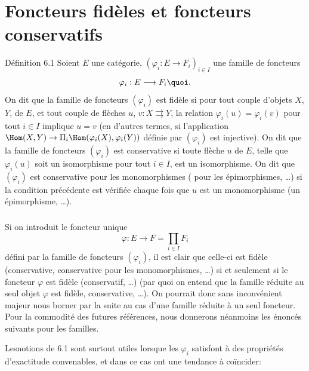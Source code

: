 \section{Foncteurs fidèles et foncteurs
  conservatifs}\pageoriginale

\begin{enonce*}{Définition 6.1}
Soient $E$ une catégorie, $(\varphi_i:E\rightarrow F_i)_{i\in I}$
une famille de foncteurs
$$
\varphi_i:E\longrightarrow F_i{\quoi}.
$$
On dit que la famille de foncteurs $(\varphi_i)$ est fidèle si pour
tout couple d'objets $X$, $Y$, de $E$, et tout couple de flèches
$u$, $v:X\rightrightarrows Y$, la relation
$\varphi_i(u)=\varphi_i(v)$ pour tout $i\in I$ implique $u=v$ (en
d'autres termes, si l'application $\Hom(X,Y)\rightarrow
\Pi_i\Hom(\varphi_i(X),\varphi_i(Y))$ définie par $(\varphi_i)$ est
injective). On dit que la famille de foncteurs $(\varphi_i)$ est
conservative si toute flèche $u$ de $E$, telle que $\varphi_i(u)$
soit un isomorphisme pour tout $i\in I$, est un isomorphisme. On dit
que $(\varphi_i)$ est conservative pour les monomorphismes (\resp
pour les épimorphismes, \resp \ldots) si la condition précédente est
vérifiée chaque fois que $u$ est un monomorphisme (\resp  un
épimorphisme, \resp \ldots).
\end{enonce*}

\setcounter{subsection}{1} \setcounter{subsubsection}{0}
\subsubsection{}
Si on introduit le foncteur unique
$$
\varphi:E\longrightarrow F=\prod_{i\in I} F_i
$$
défini par la famille de foncteurs $(\varphi_i)$, il est clair que
celle-ci est fidèle (\resp  conservative, \resp  conservative pour
les monomorphismes, \resp\ldots) si et seulement si le foncteur
$\varphi$ est fidèle (\resp  conservatif, \resp\ldots) (par quoi on
entend que la famille réduite au seul objet $\varphi$ est fidèle,
\resp  conservative, \resp\ldots). On pourrait donc sans
inconvénient majeur nous borner par la suite au cas d'une famille
réduite à un seul foncteur. Pour la commodité des futures
références, nous donnerons néanmoins les énoncés suivants pour les
familles.

Les\pageoriginale notions de 6.1 sont surtout utiles lorsque les
$\varphi_i$ satisfont à des propriétés d'exactitude convenables, et
dans ce cas ont une tendance à coïncider:

